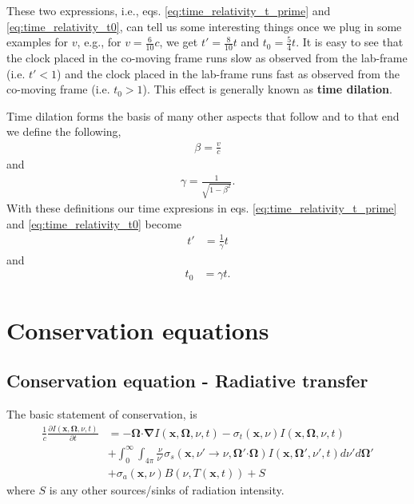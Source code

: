 \documentclass[10pt,letterpaper,notitlepage]{article}
\numberwithin{equation}{section}
\newcommand{\Omegabf}{\mathbf{\Omega}}
\newcommand{\bnabla}{\boldsymbol{\nabla}}
\newcommand{\position}{\mathbf{x}}
\newcommand{\dotp}{\boldsymbol{\cdot}}
\newcommand{\beqn}{\begin{equation}\begin{aligned}}
\newcommand{\eeqn}{\end{aligned}\end{equation}}
\begin{document}
These two expressions, i.e., eqs. \eqref{eq:time_relativity_t_prime} and \eqref{eq:time_relativity_t0}, can tell us some interesting things once we plug in some examples for $v$, e.g., for $v=\frac{6}{10} c$, we get $t'=\frac{8}{10}t$ and $t_0=\frac{5}{4}t$. It is easy to see that the clock placed in the co-moving frame runs slow as observed from the lab-frame (i.e. $t'<1$) and the clock placed in the lab-frame runs fast as observed from the co-moving frame (i.e. $t_0>1$). This effect is generally known as \textbf{time dilation}.

Time dilation forms the basis of many other aspects that follow and to that end we define the following,
\beqn
\beta = \frac{v}{c} 
\eeqn
and 
\beqn 
\gamma = \frac{1}{\sqrt{1-\beta^2}}.
\eeqn 
With these definitions our time expresions in eqs. \eqref{eq:time_relativity_t_prime} and \eqref{eq:time_relativity_t0} become
\beqn \label{eq:time_relativity_t_prime2}
t' &= \frac{1}{\gamma} t
\eeqn 
and
\beqn \label{eq:time_relativity_t02}
t_0 &= \gamma t.
\eeqn 


\newpage
\section{Conservation equations}
\subsection{Conservation equation - Radiative transfer}
The basic statement of conservation, is
\beqn 
\frac{1}{c} \frac{\partial I(\position, \Omegabf, \nu, t)}{\partial t} &=
-\Omegabf \dotp \bnabla I(\position, \Omegabf, \nu, t)
- \sigma_t(\position,\nu) I(\position, \Omegabf, \nu, t) \\
&+ \int_0^{\infty} \int_{4\pi} \frac{\nu}{\nu'} \sigma_s(\position,\nu'{\to}\nu,\Omegabf'{\dotp}\Omegabf) I(\position, \Omegabf', \nu', t)  d\nu' d\Omegabf' \\
&+ \sigma_a(\position,\nu) B(\nu,T(\position, t))+S
\eeqn 
where $S$ is any other sources/sinks of radiation intensity. 
\end{document}
